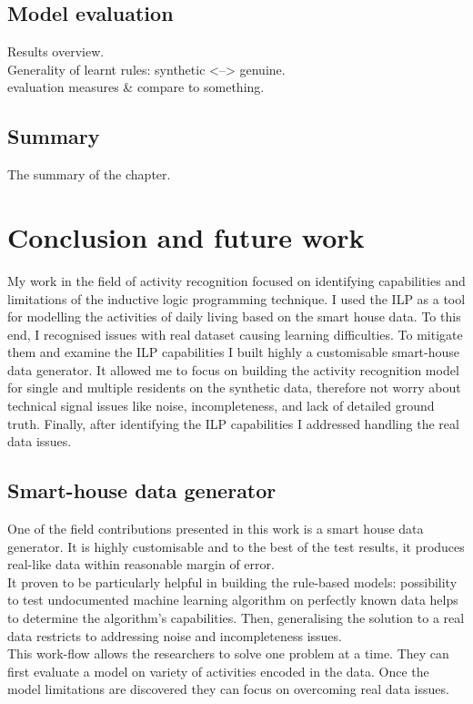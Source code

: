 \documentclass[10pt, a4paper, pdflatex, leqno, twoside, openright]{report}
\begin{document}
  \section{Model evaluation}
Results overview.\\
Generality of learnt rules: synthetic <--> genuine.\\
evaluation measures \& compare to something.\\

  \section{Summary}
The summary of the chapter.

\chapter{Conclusion and future work\label{ch:summary}}
My work in the field of activity recognition focused on identifying capabilities and limitations of the inductive logic programming technique. I used the ILP as a tool for modelling the activities of daily living based on the smart house data. To this end, I recognised issues with real dataset causing learning difficulties. To mitigate them and examine the ILP capabilities I built highly a customisable smart-house data generator. It allowed me to focus on building the activity recognition model for single and multiple residents on the synthetic data, therefore not worry about technical signal issues like noise, incompleteness, and lack of detailed ground truth. Finally, after identifying the ILP capabilities I addressed handling the real data issues.

  \section{Smart-house data generator} %
One of the field contributions presented in this work is a smart house data generator. It is highly customisable and to the best of the test results, it produces real-like data within reasonable margin of error.\\
It proven to be particularly helpful in building the rule-based models: possibility to test undocumented machine learning algorithm on perfectly known data helps to determine the algorithm's capabilities. Then, generalising the solution to a real data restricts to addressing noise and incompleteness issues.\\
This work-flow allows the researchers to solve one problem at a time. They can first evaluate a model on variety of activities encoded in the data. Once the model limitations are discovered they can focus on overcoming real data issues.
\end{document}
